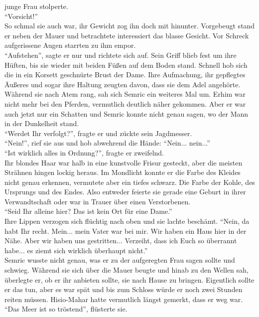 junge Frau stolperte. \\
``Vorsicht!''\\
So schmal sie auch war, ihr Gewicht zog ihn doch mit hinunter. Vorgebeugt stand er neben der Mauer 
und betrachtete interessiert das blasse Gesicht. Vor Schreck aufgerissene Augen starrten zu ihm 
empor. \\
``Aufstehen'', sagte er nur und richtete sich auf. Sein Griff blieb fest um ihre Hüften, bis sie 
wieder mit beiden Füßen auf dem Boden stand. Schnell hob sich die in ein Korsett geschnürte Brust 
der Dame. Ihre Aufmachung, ihr gepflegtes Äußeres und sogar ihre Haltung zeugten davon, dass sie 
dem Adel angehörte. Während sie nach Atem rang, sah sich Semric ein weiteres Mal um. Erhim war 
nicht mehr bei den Pferden, vermutlich deutlich näher gekommen. Aber er war auch jetzt nur ein 
Schatten und Semric konnte nicht genau sagen, wo der Mann in der Dunkelheit stand.\\
``Werdet Ihr verfolgt?'', fragte er und zückte sein Jagdmesser.\\
``Nein!'', rief sie aus und hob abwehrend die Hände: ``Nein... nein...''\\
``Ist wirklich alles in Ordnung?'', fragte er zweifelnd.\\
Ihr blondes Haar war halb in eine kunstvolle Frisur gesteckt, aber die meisten Strähnen hingen 
lockig heraus. Im Mondlicht konnte er die Farbe des Kleides nicht genau erkennen, vermutete aber 
ein tiefes schwarz. Die Farbe der Kohle, des Ursprungs und des Endes. Also entweder feierte sie 
gerade eine Geburt in ihrer Verwandtschaft oder war in Trauer über einen Verstorbenen.\\
``Seid Ihr alleine hier? Das ist kein Ort für eine Dame.''\\
Ihre Lippen verzogen sich flüchtig nach oben und sie lachte beschämt. ``Nein, da habt Ihr recht. 
Mein... mein Vater war bei mir. Wir haben ein Haus hier in der Nähe. Aber wir haben uns 
gestritten... Verzeiht, dass ich Euch so überrannt habe... es ziemt sich wirklich überhaupt 
nicht.''\\
Semric wusste nicht genau, was er zu der aufgeregten Frau sagen sollte und schwieg. Während sie 
sich über die Mauer beugte und hinab zu den Wellen sah, überlegte er, ob er ihr anbieten sollte, 
sie nach Hause zu bringen. Eigentlich sollte er das tun, aber es war spät und bis zum Schloss würde 
er noch zwei Stunden reiten müssen. Hisio-Mahar hatte vermutlich längst gemerkt, dass er weg war.\\
``Das Meer ist so tröstend'', flüsterte sie.\\
